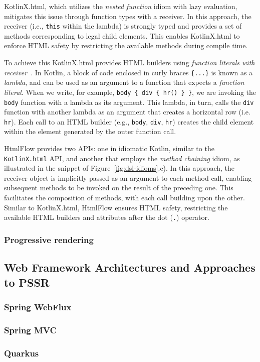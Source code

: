 KotlinX.html, which utilizes the \textit{nested function} idiom with lazy
evaluation, mitigates this issue through function types with a receiver. 
In this approach, the receiver (i.e., \texttt{this} within the lambda) is
strongly typed and provides a set of methods corresponding to legal child
elements.
This enables KotlinX.html to enforce HTML safety by restricting the available
methods during compile time.

To achieve this KotlinX.html provides HTML builders using \textit{function
literals with receiver}~\cite{kotlinlang}.
In Kotlin, a block of code enclosed in curly braces \texttt{\{...\}} is known as
a \emph{lambda}, and can be used as an argument to
a function that expects a \emph{function literal}.
When we write, for example, \texttt{body \{ div \{ hr() \} \}}, we are
invoking the \texttt{body} function with a lambda as its argument. This
lambda, in turn, calls the \texttt{div} function with another lambda as an
argument that creates a horizontal row (i.e. \texttt{hr}).
Each call to an HTML builder (e.g., \texttt{body}, \texttt{div}, \texttt{hr})
creates the child element within the element generated by the outer function
call.

HtmlFlow provides two APIs: one in idiomatic Kotlin, similar to the \texttt{KotlinX.html} 
API, and another that employs the \textit{method chaining} idiom, as illustrated 
in the snippet of Figure~\ref{fig:dsl-idioms}.c).
In this approach, the receiver object is implicitly passed as an argument to
each method call, enabling subsequent methods to be invoked on the result of the
preceding one.
This facilitates the composition of methods, with each call building upon the
other.
Similar to KotlinX.html, HtmlFlow ensures HTML safety, restricting the available
HTML builders and attributes after the dot (\texttt{.}) operator.


\subsubsection{Progressive rendering}


\subsection{Web Framework Architectures and Approaches to PSSR}

\subsubsection{Spring WebFlux}

\subsubsection{Spring MVC}

\subsubsection{Quarkus}